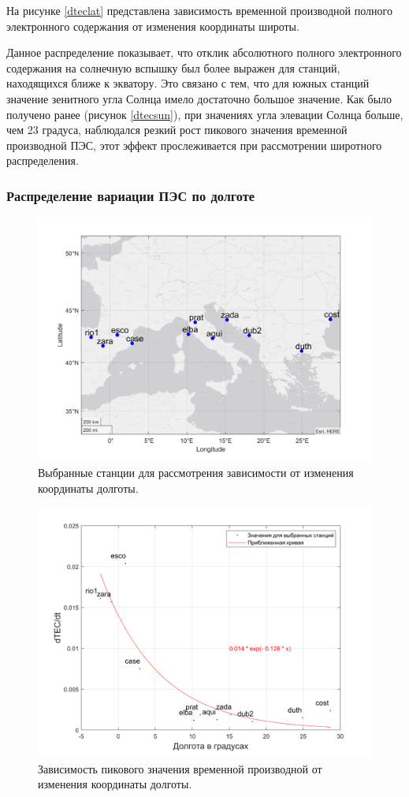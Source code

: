\documentclass[a4paper]{article}
\begin{document}
На рисунке \ref{dteclat} представлена зависимость временной производной полного электронного содержания от изменения координаты широты.

Данное распределение показывает, что отклик абсолютного полного электронного содержания на солнечную вспышку был более выражен для станций, находящихся ближе к экватору. Это связано с тем, что для южных станций значение зенитного угла Солнца имело достаточно большое значение. Как было получено ранее (рисунок \ref{dtecsun}), при значениях угла элевации Солнца больше, чем 23 градуса, наблюдался резкий рост пикового значения временной производной ПЭС, этот эффект прослеживается при рассмотрении широтного распределения.




\subsubsection{Распределение вариации ПЭС по долготе}

\begin{figure}[h!]
\centering
\includegraphics[width = 0.8\linewidth]{pics/clean_pics/lonStations.png}
\caption{Выбранные станции для рассмотрения зависимости от изменения координаты долготы.}
\label{stationslon}
\end{figure}

\begin{figure}[H]
\centering
\includegraphics[width = 0.8\linewidth]{pics/clean_pics/dtec_lon.png}
\caption{Зависимость пикового значения временной производной от изменения координаты долготы.}
\label{dteclon}
\end{figure}
\end{document}
